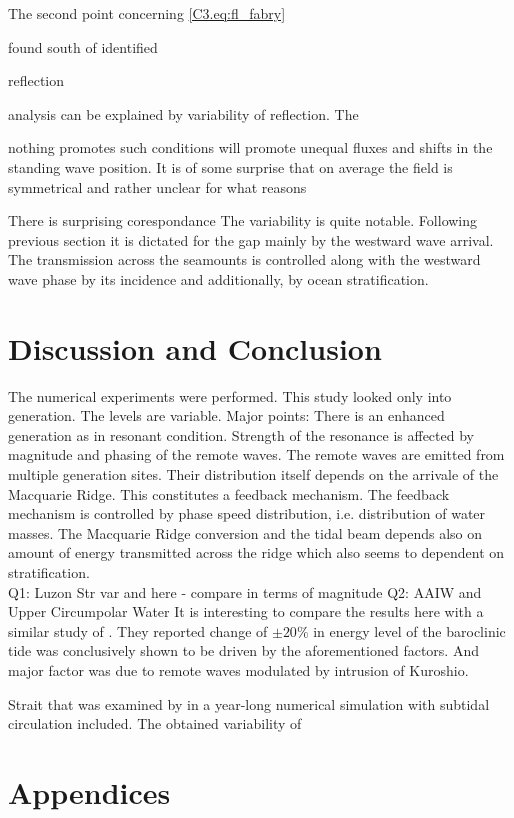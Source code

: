 \documentclass[12pt]{article}
\begin{document}
The second point concerning \eqref{C3.eq:fl_fabry} 


found south of 
identified 

reflection 

analysis can be 
explained by variability of reflection. The 

nothing promotes such conditions will promote unequal 
fluxes and 
shifts in 
the standing wave 
position. It is of some 
surprise that on average the field is symmetrical and rather unclear for what reasons

There is surprising corespondance The variability is quite notable. Following 
previous section 
it is dictated for 
the gap mainly by the westward wave arrival. The transmission across the seamounts is controlled 
along with the westward wave phase by its incidence and additionally, by ocean stratification.\\

\section{Discussion and Conclusion}
The numerical experiments were performed. This study looked only into generation. The levels are 
variable.
Major points:
There is an enhanced generation as in resonant condition. Strength of the resonance is affected by 
magnitude and phasing of the remote waves. The remote waves are emitted from multiple generation 
sites. Their distribution itself depends on the arrivale of the Macquarie Ridge. This constitutes a 
feedback mechanism. The feedback mechanism is controlled by phase speed distribution, i.e. 
distribution of water masses. The Macquarie Ridge conversion and the tidal beam depends also on 
amount of energy transmitted across the ridge which also seems to dependent on stratification.\\
Q1: Luzon Str var and here - compare in terms of magnitude
Q2: AAIW and Upper Circumpolar Water
It is interesting to compare the results here with a similar study of \citep{kerry2014impact}. They 
reported change of $\pm 20\%$ in energy level of the baroclinic tide was conclusively shown to be 
driven by the aforementioned factors. And major factor was due to remote waves modulated by 
intrusion of Kuroshio. 

Strait that was examined by  in a year-long numerical simulation with 
subtidal circulation included. The obtained variability of 

\section*{Appendices}
\end{document}
